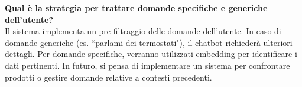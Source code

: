 \begin{itemize}
\textbf{Qual è la strategia per trattare domande specifiche e generiche dell'utente?}\\
Il sistema implementa un pre-filtraggio delle domande dell'utente. In caso di domande generiche (es. ``parlami dei termostati"), il chatbot richiederà ulteriori dettagli. Per domande specifiche, verranno utilizzati embedding per identificare i dati pertinenti. In futuro, si pensa di implementare un sistema per confrontare prodotti o gestire domande relative a contesti precedenti.\\


\end{itemize}